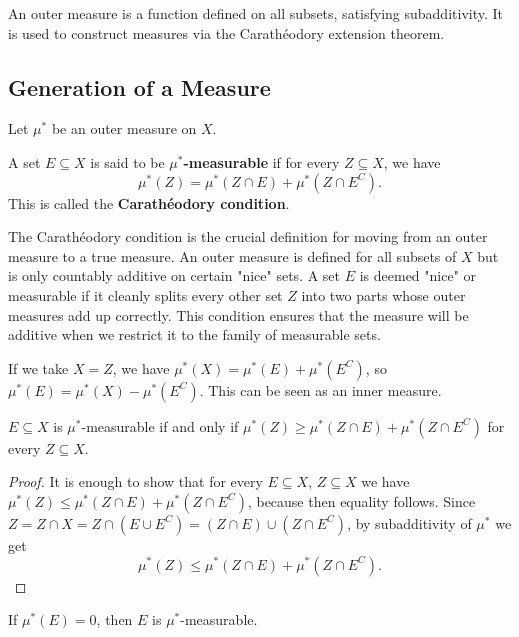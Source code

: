 \begin{remark}
An outer measure is a function defined on all subsets, satisfying subadditivity. It is used to construct measures via the Carathéodory extension theorem.
\end{remark}

\clearpage
\subsection{Generation of a Measure}
Let $\mu^*$ be an outer measure on $X$.

\begin{definition}
A set $E \subseteq X$ is said to be \textbf{$\mu^*$-measurable} if for every $Z \subseteq X$, we have
\[
\mu^*(Z) = \mu^*(Z \cap E) + \mu^*(Z \cap E^C).
\]
This is called the \textbf{Carathéodory condition}.
\end{definition}

\begin{remark}
The Carathéodory condition is the crucial definition for moving from an outer measure to a true measure. An outer measure is defined for all subsets of $X$ but is only countably additive on certain "nice" sets. A set $E$ is deemed "nice" or measurable if it cleanly splits every other set $Z$ into two parts whose outer measures add up correctly. This condition ensures that the measure will be additive when we restrict it to the family of measurable sets.

If we take $X = Z$, we have $\mu^*(X) = \mu^*(E) + \mu^*(E^C)$, so $\mu^*(E) = \mu^*(X) - \mu^*(E^C)$. This can be seen as an inner measure.
\end{remark}

\begin{lemma}
$E \subseteq X$ is $\mu^*$-measurable if and only if $\mu^*(Z) \geq \mu^*(Z \cap E) + \mu^*(Z \cap E^C)$ for every $Z \subseteq X$.
\end{lemma}

\begin{proof}
It is enough to show that for every $E \subseteq X$, $Z \subseteq X$ we have $\mu^*(Z) \leq \mu^*(Z \cap E) + \mu^*(Z \cap E^C)$, because then equality follows.
Since $Z = Z \cap X = Z \cap (E \cup E^C) = (Z \cap E) \cup (Z \cap E^C)$, by subadditivity of $\mu^*$ we get
\[
\mu^*(Z) \leq \mu^*(Z \cap E) + \mu^*(Z \cap E^C).
\]
\end{proof}

\begin{lemma}
If $\mu^*(E) = 0$, then $E$ is $\mu^*$-measurable.
\end{lemma}

